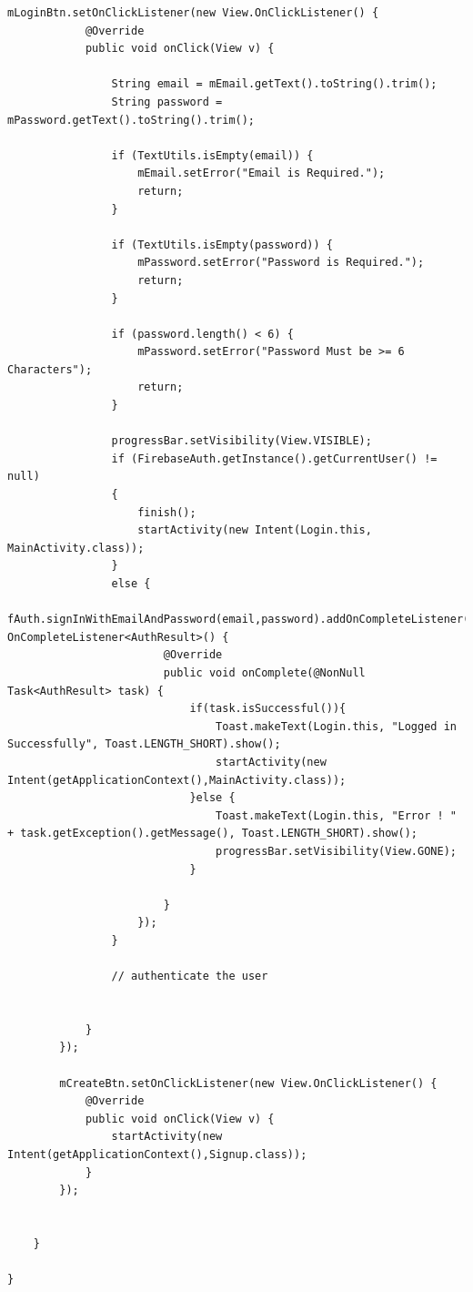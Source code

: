 \documentclass[12pt,a4paper]{article}
\begin{document}
\begin{lstlisting}[frame=single]
        mLoginBtn.setOnClickListener(new View.OnClickListener() {
            @Override
            public void onClick(View v) {

                String email = mEmail.getText().toString().trim();
                String password = mPassword.getText().toString().trim();

                if (TextUtils.isEmpty(email)) {
                    mEmail.setError("Email is Required.");
                    return;
                }

                if (TextUtils.isEmpty(password)) {
                    mPassword.setError("Password is Required.");
                    return;
                }

                if (password.length() < 6) {
                    mPassword.setError("Password Must be >= 6 Characters");
                    return;
                }

                progressBar.setVisibility(View.VISIBLE);
                if (FirebaseAuth.getInstance().getCurrentUser() != null)
                {
                    finish();
                    startActivity(new Intent(Login.this, MainActivity.class));
                }
                else {
                    fAuth.signInWithEmailAndPassword(email,password).addOnCompleteListener(new OnCompleteListener<AuthResult>() {
                        @Override
                        public void onComplete(@NonNull Task<AuthResult> task) {
                            if(task.isSuccessful()){
                                Toast.makeText(Login.this, "Logged in Successfully", Toast.LENGTH_SHORT).show();
                                startActivity(new Intent(getApplicationContext(),MainActivity.class));
                            }else {
                                Toast.makeText(Login.this, "Error ! " + task.getException().getMessage(), Toast.LENGTH_SHORT).show();
                                progressBar.setVisibility(View.GONE);
                            }

                        }
                    });
                }

                // authenticate the user


            }
        });

        mCreateBtn.setOnClickListener(new View.OnClickListener() {
            @Override
            public void onClick(View v) {
                startActivity(new Intent(getApplicationContext(),Signup.class));
            }
        });


    }

}

\end{lstlisting}
\end{document}

